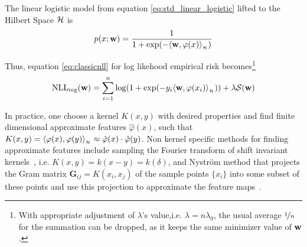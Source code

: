 The linear logistic model from equation \ref{eq:std_linear_logistic} lifted to
the Hilbert Space $\mathcal{H}$ is
\begin{equation}
\label{eq:hslogistic}
p(x;\mathrm{\mathbf{w}}) = \frac{1}{1+\exp(-\langle \mathrm{\mathbf{w}},\varphi(x)\rangle_{_{\mathcal{H}}})}
\end{equation}

Thus, equation \ref{eq:classicnll} for log likehood empirical risk
becomes\footnote{With appropriate adjustment of $\lambda$'s value,i.e.
$\lambda=n\lambda_0$, the usual average $\nicefrac{1}{n}$ for the summation can
be dropped, as it keeps the same minimizer value of $\mathrm{\mathbf{w}}$.}
\begin{equation}
\label{eq:hsnll}
\text{NLL}_{\text{reg}}(\mathrm{\mathbf{w}}) =  \sum_{i=1}^n \log(1+\exp(-y_i
\langle \mathrm{\mathbf{w}},\varphi(x_i)\rangle_{_{\mathcal{H}}})) +\lambda\mathcal{S}(\mathrm{\mathbf{w}})
\end{equation}

In practice, one choose a kernel $K(x,y)$ with desired properties and
find finite dimensional approximate features $\hat\varphi(x)$, such that
$K(x,y)=\langle \varphi(x),\varphi(y)\rangle_{_{\mathcal{H}}}\approx\hat\varphi(x)\cdot\hat\varphi(y)$.
Non kernel specific methods for finding approximate features include sampling
the Fourier transform of shift invariant kernels~\cite{rahimi2007random}, i.e.
$K(x,y)=k(x-y)=k(\delta)$, and Nystr\"om method that projects the Gram matrix
$\mathbf{G}_{ij}=K(x_i,x_j)$ of the sample points $\{x_i\}$ into some subset of
these points and use this projection to approximate the feature
maps~\cite{williams2000using}.
